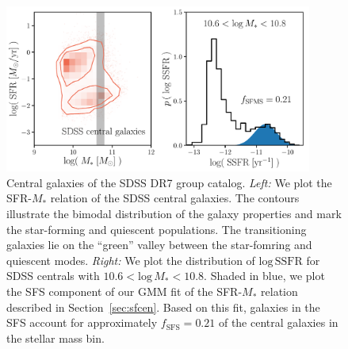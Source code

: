\documentclass[12pt, letterpaper, preprint]{aastex}
\begin{document}
\begin{figure}
\begin{center}
\includegraphics[width=0.9\textwidth]{figs/groupcat.pdf}
    \caption{Central galaxies of the SDSS DR7 group catalog. \emph{Left:} We plot 
    the SFR-$M_*$ relation of the SDSS central galaxies. The contours illustrate the bimodal
    distribution of the galaxy properties and mark the star-forming and quiescent populations. 
    The transitioning galaxies lie on the ``green'' valley between the star-fomring and quiescent
    modes. %
    \emph{Right:} We plot the distribution of $\mathrm{log}\,\mathrm{SSFR}$ for SDSS centrals
    with $10.6 < \mathrm{log}\,M_* < 10.8$. Shaded in blue, we plot the SFS component of our 
    GMM fit of the SFR-$M_*$ relation described in Section~\ref{sec:sfcen}. Based on this fit, 
    galaxies in the SFS account for approximately $f_\mathrm{SFS} = 0.21$ of the central 
    galaxies in the stellar mass bin.} \label{fig:groupcat}
\end{center}
\end{figure}
\end{document}
